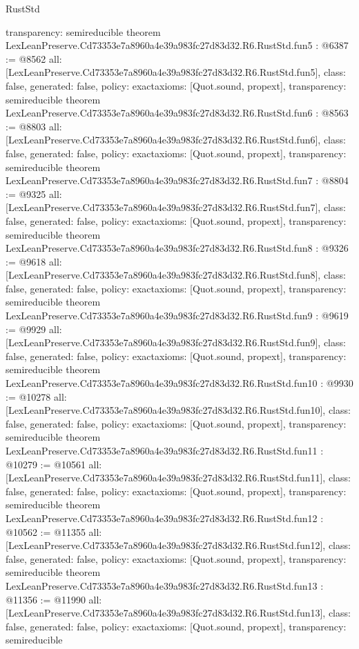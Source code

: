 \begin{lexlean}{RustStd}
\begin{coremodule}
{  transparency: semireducible
}
theorem LexLeanPreserve.Cd73353e7a8960a4e39a983fc27d83d32.R6.RustStd.fun5 : @6387 := @8562 {
  all: [LexLeanPreserve.Cd73353e7a8960a4e39a983fc27d83d32.R6.RustStd.fun5],
  class: false,
  generated: false,
  policy: exact{axioms: [Quot.sound, propext]},
  transparency: semireducible
}
theorem LexLeanPreserve.Cd73353e7a8960a4e39a983fc27d83d32.R6.RustStd.fun6 : @8563 := @8803 {
  all: [LexLeanPreserve.Cd73353e7a8960a4e39a983fc27d83d32.R6.RustStd.fun6],
  class: false,
  generated: false,
  policy: exact{axioms: [Quot.sound, propext]},
  transparency: semireducible
}
theorem LexLeanPreserve.Cd73353e7a8960a4e39a983fc27d83d32.R6.RustStd.fun7 : @8804 := @9325 {
  all: [LexLeanPreserve.Cd73353e7a8960a4e39a983fc27d83d32.R6.RustStd.fun7],
  class: false,
  generated: false,
  policy: exact{axioms: [Quot.sound, propext]},
  transparency: semireducible
}
theorem LexLeanPreserve.Cd73353e7a8960a4e39a983fc27d83d32.R6.RustStd.fun8 : @9326 := @9618 {
  all: [LexLeanPreserve.Cd73353e7a8960a4e39a983fc27d83d32.R6.RustStd.fun8],
  class: false,
  generated: false,
  policy: exact{axioms: [Quot.sound, propext]},
  transparency: semireducible
}
theorem LexLeanPreserve.Cd73353e7a8960a4e39a983fc27d83d32.R6.RustStd.fun9 : @9619 := @9929 {
  all: [LexLeanPreserve.Cd73353e7a8960a4e39a983fc27d83d32.R6.RustStd.fun9],
  class: false,
  generated: false,
  policy: exact{axioms: [Quot.sound, propext]},
  transparency: semireducible
}
theorem LexLeanPreserve.Cd73353e7a8960a4e39a983fc27d83d32.R6.RustStd.fun10 : @9930 := @10278 {
  all: [LexLeanPreserve.Cd73353e7a8960a4e39a983fc27d83d32.R6.RustStd.fun10],
  class: false,
  generated: false,
  policy: exact{axioms: [Quot.sound, propext]},
  transparency: semireducible
}
theorem LexLeanPreserve.Cd73353e7a8960a4e39a983fc27d83d32.R6.RustStd.fun11 : @10279 := @10561 {
  all: [LexLeanPreserve.Cd73353e7a8960a4e39a983fc27d83d32.R6.RustStd.fun11],
  class: false,
  generated: false,
  policy: exact{axioms: [Quot.sound, propext]},
  transparency: semireducible
}
theorem LexLeanPreserve.Cd73353e7a8960a4e39a983fc27d83d32.R6.RustStd.fun12 : @10562 := @11355 {
  all: [LexLeanPreserve.Cd73353e7a8960a4e39a983fc27d83d32.R6.RustStd.fun12],
  class: false,
  generated: false,
  policy: exact{axioms: [Quot.sound, propext]},
  transparency: semireducible
}
theorem LexLeanPreserve.Cd73353e7a8960a4e39a983fc27d83d32.R6.RustStd.fun13 : @11356 := @11990 {
  all: [LexLeanPreserve.Cd73353e7a8960a4e39a983fc27d83d32.R6.RustStd.fun13],
  class: false,
  generated: false,
  policy: exact{axioms: [Quot.sound, propext]},
  transparency: semireducible
}
\end{coremodule}
\end{lexlean}
